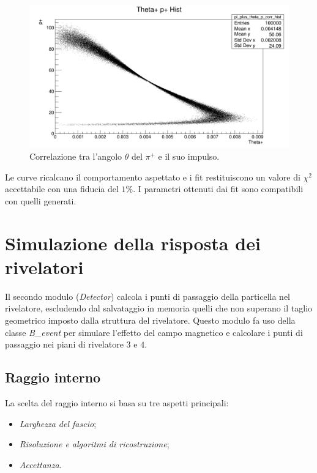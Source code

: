 \documentclass[8pt]{extarticle}
\begin{document}
\begin{figure}
	\begin{center}
		\includegraphics[scale=0.3]{gen_thetap} 
		\caption{Correlazione tra l'angolo $\theta$ del $\pi^+$ e il suo impulso.}
		\label{fig:gen_thetap}
	\end{center}
\end{figure}

Le curve ricalcano il comportamento aspettato e i fit restituiscono un valore di $\chi^2$ accettabile con una fiducia del $1\%$. I parametri ottenuti dai fit sono compatibili con quelli generati.

\section{Simulazione della risposta dei rivelatori} \label{sec:detector}
Il secondo modulo (\textit{Detector}) calcola i punti di passaggio della particella nel rivelatore, escludendo dal salvataggio in memoria quelli che non superano il taglio geometrico imposto dalla struttura del rivelatore. Questo modulo fa uso della classe \textit{B\_event} per simulare l'effetto del campo magnetico e calcolare i punti di passaggio nei piani di rivelatore $3$ e $4$.

\subsection{Raggio interno} \label{subsec:raggio_interno}
La scelta del raggio interno si basa su tre aspetti principali:
\begin{itemize}
\item \textit{Larghezza del fascio};
\item \textit{Risoluzione e algoritmi di ricostruzione};
\item \textit{Accettanza}.
\end{itemize}
\end{document}
